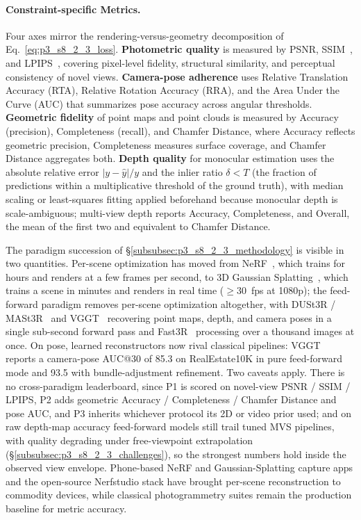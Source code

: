 \paragraph{Constraint-specific Metrics.}
Four axes mirror the rendering-versus-geometry decomposition of Eq.~\eqref{eq:p3_s8_2_3_loss}.
\textbf{Photometric quality} is measured by PSNR, SSIM~\cite{wang2004image}, and LPIPS~\cite{zhang2018unreasonable}, covering pixel-level fidelity, structural similarity, and perceptual consistency of novel views.
\textbf{Camera-pose adherence} uses Relative Translation Accuracy (RTA), Relative Rotation Accuracy (RRA), and the Area Under the Curve (AUC) that summarizes pose accuracy across angular thresholds.
\textbf{Geometric fidelity} of point maps and point clouds is measured by Accuracy (precision), Completeness (recall), and Chamfer Distance, where Accuracy reflects geometric precision, Completeness measures surface coverage, and Chamfer Distance aggregates both.
\textbf{Depth quality} for monocular estimation uses the absolute relative error $|y - \hat{y}| / y$ and the inlier ratio $\delta\!<\!T$ (the fraction of predictions within a multiplicative threshold of the ground truth), with median scaling or least-squares fitting applied beforehand because monocular depth is scale-ambiguous; multi-view depth reports Accuracy, Completeness, and Overall, the mean of the first two and equivalent to Chamfer Distance.

The paradigm succession of §\ref{subsubsec:p3_s8_2_3_methodology} is visible in two quantities.
Per-scene optimization has moved from NeRF~\cite{mildenhall2021nerf}, which trains for hours and renders at a few frames per second, to 3D Gaussian Splatting~\cite{kerbl20233d}, which trains a scene in minutes and renders in real time (${\geq}30$~fps at 1080p); the feed-forward paradigm removes per-scene optimization altogether, with DUSt3R / MASt3R~\cite{wang2024dust3r, mast3r} and VGGT~\cite{wang2025vggt} recovering point maps, depth, and camera poses in a single sub-second forward pass and Fast3R~\cite{yang2025fast3r} processing over a thousand images at once.
On pose, learned reconstructors now rival classical pipelines: VGGT~\cite{wang2025vggt} reports a camera-pose AUC@30 of 85.3 on RealEstate10K in pure feed-forward mode and 93.5 with bundle-adjustment refinement.
Two caveats apply. There is no cross-paradigm leaderboard, since P1 is scored on novel-view PSNR / SSIM / LPIPS, P2 adds geometric Accuracy / Completeness / Chamfer Distance and pose AUC, and P3 inherits whichever protocol its 2D or video prior used; and on raw depth-map accuracy feed-forward models still trail tuned MVS pipelines, with quality degrading under free-viewpoint extrapolation (§\ref{subsubsec:p3_s8_2_3_challenges}), so the strongest numbers hold inside the observed view envelope.
Phone-based NeRF and Gaussian-Splatting capture apps and the open-source Nerfstudio stack have brought per-scene reconstruction to commodity devices, while classical photogrammetry suites remain the production baseline for metric accuracy.


